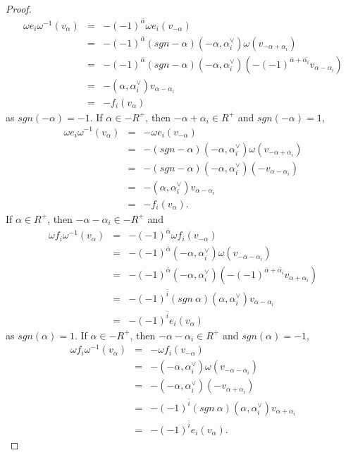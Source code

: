\documentclass[10pt,a4paper]{amsart}
\newcommand{\al}{\alpha}
\newcommand{\om}{\omega}
\begin{document}
\begin{proof}
\begin{eqnarray*}
			\om e_i\om^{-1}(v_{\al})&=&-(-1)^{\bar{\al}}\om e_i(v_{-\al})\\&=&-(-1)^{\bar{\al}}(sgn-\al)(-\al,\al_i^{\vee})\om(v_{-\al+\al_i})\\&=&-(-1)^{\bar{\al}}(sgn-\al)(-\al,\al_i^{\vee})(-(-1)^{\bar{\al}+\bar{\al_i}}v_{\al-\al_i})\\&=&-(\al,\al_i^{\vee})v_{\al-\al_i}\\&=&-f_i(v_{\al})
		\end{eqnarray*}
		as $sgn(-\al)=-1$. If $\al\in-R^+$, then $-\al+\al_i\in R^+$ and $sgn(-\al)=1$,
		\begin{eqnarray*}
			\om e_i\om^{-1}(v_{\al})&=&-\om e_i(v_{-\al})\\&=&-(sgn-\al)(-\al,\al_i^{\vee})\om(v_{-\al+\al_i})\\&=&-(sgn-\al)(-\al,\al_i^{\vee})(-v_{\al-\al_i})\\&=&-(\al,\al_i^{\vee})v_{\al-\al_i}\\&=&-f_i(v_{\al}).
		\end{eqnarray*}
		If $\al\in R^+$, then $-\al-\al_i\in-R^+$ and
		\begin{eqnarray*}
			\om f_i\om^{-1}(v_{\al})&=&-(-1)^{\bar{\al}}\om f_i(v_{-\al})\\&=&-(-1)^{\bar{\al}}(-\al,\al_i^{\vee})\om(v_{-\al-\al_i})\\&=&-(-1)^{\bar{\al}}(-\al,\al_i^{\vee})(-(-1)^{\bar{\al}+\bar{\al_i}}v_{\al+\al_i})\\&=&-(-1)^{\bar{i}}(sgn~\al)(\al,\al_i^{\vee})v_{\al-\al_i}\\&=&-(-1)^{\bar{i}}e_i(v_{\al})
		\end{eqnarray*}
		as $sgn(\al)=1$. If $\al\in-R^+$, then $-\al-\al_i\in R^+$ and $sgn(\al)=-1$,
		\begin{eqnarray*}
			\om f_i\om^{-1}(v_{\al})&=&-\om f_i(v_{-\al})\\&=&-(-\al,\al_i^{\vee})\om(v_{-\al-\al_i})\\&=&-(-\al,\al_i^{\vee})(-v_{\al+\al_i})\\&=&-(-1)^{\bar{i}}(sgn~\al)(\al,\al_i^{\vee})v_{\al+\al_i}\\&=&-(-1)^{\bar{i}}e_i(v_{\al}).
		\end{eqnarray*}
	\end{proof}
\end{document}
